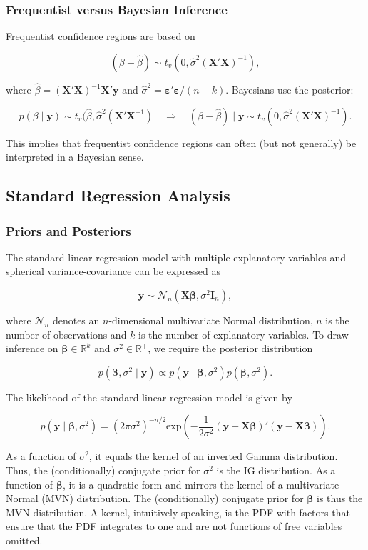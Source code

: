 \subsubsection{Frequentist versus Bayesian Inference}

Frequentist confidence regions are based on 

\[
(\beta-\hat{\beta}) \sim t_v(0,\hat{\sigma}^2(\bm{X}'\bm{X})^{-1}),
\]

where $\hat{\beta} = (\bm{X}'\bm{X})^{-1}\bm{X}'\bm{y}$ and $\hat\sigma^2 = \bm{\varepsilon}'\bm{\varepsilon}/(n-k)$. Bayesians use the posterior:

\[
	p(\beta\mid\bm{y})\sim t_v(\hat\beta,\hat\sigma^2(\bm{X}'\bm{X}^{-1}) \quad\Rightarrow\quad (\beta-\hat\beta)\mid\bm{y}\sim t_v(0,\hat\sigma^2(\bm{X}'\bm{X})^{-1}).
\]

This implies that frequentist confidence regions can often (but not generally) be interpreted in a Bayesian sense.

\subsection{Standard Regression Analysis}

\subsubsection{Priors and Posteriors}

The standard linear regression model with multiple explanatory variables and spherical variance-covariance can be expressed as

\[
	\bm{y}\sim\mathcal{N}_n(\bm{X\beta},\sigma^2\bm{I}_n),
\]

where $\mathcal{N}_n$ denotes an $n$-dimensional multivariate Normal distribution, $n$ is the number of observations and $k$ is the number of explanatory variables. To draw inference on $\bm{\beta}\in\mathbb{R}^k$ and $\sigma^2\in\mathbb{R}^{+}$, we require the posterior distribution 

\[
	p(\bm{\beta},\sigma^2\mid\bm{y})\propto p(\bm{y}\mid\bm{\beta},\sigma^2)p(\bm{\beta},\sigma^2).
\]

The likelihood of the standard linear regression model is given by

\[
	p(\bm{y}\mid\bm{\beta},\sigma^2) = (2\pi\sigma^2)^{-n/2}\mathrm{exp}\left(-\frac{1}{2\sigma^2}(\bm{y}-\bm{X\beta})'(\bm{y}-\bm{X\beta})\right).
\]

As a function of $\sigma^2$, it equals the kernel of an inverted Gamma distribution. Thus, the (conditionally) conjugate prior for $\sigma^2$ is the IG distribution. As a function of $\bm{\beta}$, it is a quadratic form and mirrors the kernel of a multivariate Normal (MVN) distribution. The (conditionally) conjugate prior for $\bm{\beta}$ is thus the MVN distribution. A kernel, intuitively speaking, is the PDF with factors that ensure that the PDF integrates to one and are not functions of free variables omitted.

